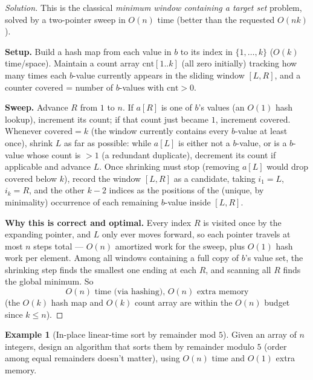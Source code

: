 \documentclass[11pt]{article}
\theoremstyle{definition}
\newtheorem{example}{Example}[section]
\begin{document}
\begin{proof}[Solution]
This is the classical \emph{minimum window containing a target set} problem, solved by a two-pointer sweep in $O(n)$ time (better than the requested $O(nk)$).

\textbf{Setup.} Build a hash map from each value in $b$ to its index in $\{1,\dots,k\}$ ($O(k)$ time/space). Maintain a count array $\mathrm{cnt}[1..k]$ (all zero initially) tracking how many times each $b$-value currently appears in the sliding window $[L,R]$, and a counter $\mathrm{covered}$ = number of $b$-values with $\mathrm{cnt}>0$.

\textbf{Sweep.} Advance $R$ from $1$ to $n$. If $a[R]$ is one of $b$'s values (an $O(1)$ hash lookup), increment its count; if that count just became $1$, increment $\mathrm{covered}$. Whenever $\mathrm{covered}=k$ (the window currently contains every $b$-value at least once), shrink $L$ as far as possible: while $a[L]$ is either not a $b$-value, or is a $b$-value whose count is $>1$ (a redundant duplicate), decrement its count if applicable and advance $L$. Once shrinking must stop (removing $a[L]$ would drop $\mathrm{covered}$ below $k$), record the window $[L,R]$ as a candidate, taking $i_1=L$, $i_k=R$, and the other $k-2$ indices as the positions of the (unique, by minimality) occurrence of each remaining $b$-value inside $[L,R]$.

\textbf{Why this is correct and optimal.} Every index $R$ is visited once by the expanding pointer, and $L$ only ever moves forward, so each pointer travels at most $n$ steps total — $O(n)$ amortized work for the sweep, plus $O(1)$ hash work per element. Among all windows containing a full copy of $b$'s value set, the shrinking step finds the smallest one ending at each $R$, and scanning all $R$ finds the global minimum. So
\[
\boxed{O(n) \text{ time (via hashing), } O(n) \text{ extra memory}}
\]
(the $O(k)$ hash map and $O(k)$ count array are within the $O(n)$ budget since $k\le n$).
\end{proof}

\begin{example}[In-place linear-time sort by remainder mod $5$]
Given an array of $n$ integers, design an algorithm that sorts them by remainder modulo $5$ (order among equal remainders doesn't matter), using $O(n)$ time and $O(1)$ extra memory.
\end{example}
\end{document}
